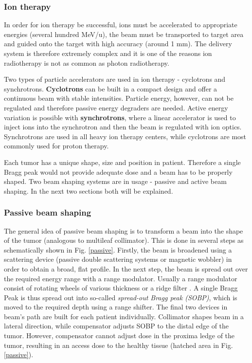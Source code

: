 \documentclass[type=dr, dr=rernat, accentcolor=tud7b,colorbacktitle, bigchapter, openright, twoside, 12pt ]{tudthesis}
\begin{document}
\subsubsection{Ion therapy}

In order for ion therapy be successful, ions must be accelerated to appropriate energies (several hundred MeV/u), the beam must be transported to target area and guided
onto the target with high accuracy (around 1 mm). The delivery system is therefore extremely complex and it is one of the reasons ion radiotherapy is not as common as photon radiotherapy.

Two types of particle accelerators are used in ion therapy - cyclotrons and synchrotrons. \textbf{Cyclotrons} can be built in a compact design and offer a continuous beam with
stable intensities. Particle energy, however, can not be regulated and therefore passive energy degraders are needed. Active energy variation is possible with \textbf{synchrotrons}, where a linear
accelerator is used to inject ions into the synchrotron and then the beam is regulated with ion optics. Synchrotrons are used in all heavy ion therapy centers, while cyclotrons are most
commonly used for proton therapy.

Each tumor has a unique shape, size and position in patient. Therefore a single Bragg peak would not provide adequate dose and a beam has to be properly shaped. Two beam shaping systems
are in usage - passive and active beam shaping. In the next two sections both will be explained.


\subsubsection{Passive beam shaping}
\label{Sec::Passive}

The general idea of passive beam shaping is to transform a beam into the shape of the tumor (analogous to multileaf collimator). This is done in several steps as schematically shown in Fig. \ref{passive}. Firstly, the beam is broadened using a scattering device (passive double scattering systems or magnetic wobbler)
in order to obtain a broad, flat profile. In the next step, the beam is spread out over the required energy range with a range modulator. Usually a range modulator consist of rotating wheels of various thickness or a ridge filter \cite{Chu1993}. A single Bragg Peak is thus spread out into so-called \textit{spread-out Bragg peak (SOBP)}, which is moved to the required depth using a range shifter. The final two devices in beam's path are built for each patient individually. Collimator shapes beam in a lateral direction, while compensator adjusts SOBP to the distal edge of the tumor. However, compensator cannot adjust dose in the proxima ledge of the tumor, resulting in an access dose to the healthy tissue (hatched area in Fig. \ref{passive}).
 
\end{document}
